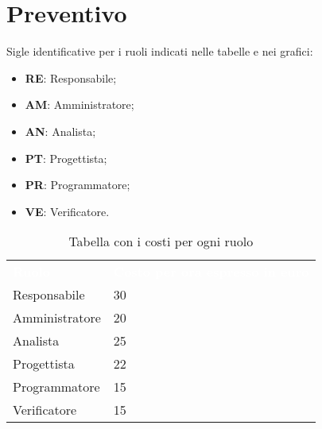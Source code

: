 \section{Preventivo}
Sigle identificative per i ruoli indicati nelle tabelle e nei grafici:
\begin{itemize}
    \item \textbf{RE}: Responsabile;
    \item \textbf{AM}: Amministratore;
    \item \textbf{AN}: Analista;
    \item \textbf{PT}: Progettista;
    \item \textbf{PR}: Programmatore;
    \item \textbf{VE}: Verificatore.
\end{itemize}

{	
\renewcommand{\arraystretch}{2}
\centering
\begin{longtable}[h!]{ C{3cm} C{3cm}}
\caption{Tabella con i costi per ogni ruolo}\\

\textcolor{white}{\textbf{Ruolo}} & \textcolor{white}{\textbf{Costo per ora espresso in euro}}\\

Responsabile   & 30 \\
Amministratore & 20 \\
Analista       & 25 \\
Progettista    & 22 \\
Programmatore  & 15 \\
Verificatore   & 15 \\
\end{longtable}
}

\clearpage


\clearpage


\clearpage


\clearpage


\clearpage
